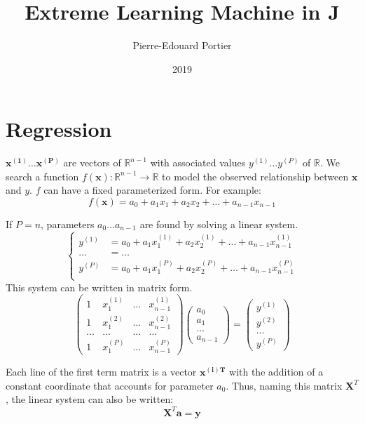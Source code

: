\documentclass[10pt]{article}%
\title{Extreme Learning Machine in J}
\author{Pierre-Edouard Portier}
\date{2019}
\renewcommand{\vec}[1]{\boldsymbol{#1}}
\begin{document}
\maketitle
\section{Regression}
$\vec{x^{(1)}}\dots\vec{x^{(P)}}$ are vectors of $\mathbb{R}^{n-1}$ with
associated values $y^{(1)}\dots y^{(P)}$ of $\mathbb{R}$.
We search a function $f(\vec{x}):\mathbb{R}^{n-1} \rightarrow \mathbb{R}$ to
model the observed relationship between $\vec{x}$ and $y$.
$f$ can have a fixed parameterized form. For example:
\[
f(\vec{x}) = a_0 + a_1 x_1 + a_2 x_2 + \dots + a_{n-1} x_{n-1}
\]

If $P=n$, parameters $a_0 \dots a_{n-1}$ are found by solving a linear system.
\[
\begin{cases}
y^{(1)} &= a_0 + a_1 x_1^{(1)} + a_2 x_2^{(1)} + \dots + a_{n-1} x_{n-1}^{(1)} \\
\dots &= \dots \\
y^{(P)} &= a_0 + a_1 x_1^{(P)} + a_2 x_2^{(P)} + \dots + a_{n-1} x_{n-1}^{(P)} \\
\end{cases}
\]
This system can be written in matrix form.
\[
\left( \begin{array}{cccc}
1 & x^{(1)}_1 & \dots & x^{(1)}_{n-1} \\
1 & x^{(2)}_1 & \dots & x^{(2)}_{n-1} \\
\dots & \dots & \dots & \dots \\
1 & x^{(P)}_1 & \dots & x^{(P)}_{n-1}
\end{array} \right)
\left( \begin{array}{c}
a_0 \\ a_1 \\ \dots \\ a_{n-1} 
\end{array} \right)
=
\left( \begin{array}{c}
y^{(1)} \\ y^{(2)} \\ \dots \\ y^{(P)} 
\end{array} \right)
\]

Each line of the first term matrix is a vector $\vec{x^{(i)T}}$ with the
addition of a constant coordinate that accounts for parameter $a_0$.
Thus, naming this matrix $\vec{X}^T$, the linear system can also be written:
\[
\vec{X}^T \vec{a} = \vec{y}
\]
\end{document}
